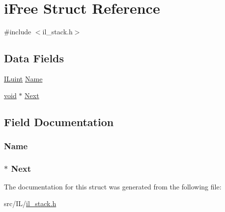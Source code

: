 \hypertarget{structi_free}{\section{i\-Free Struct Reference}
\label{structi_free}
}


{\ttfamily \#include $<$il\-\_\-stack.\-h$>$}

\subsection*{Data Fields}
\begin{DoxyCompactItemize}
\item 
\hyperlink{il_8h_ac6508d0e9c19e32f32e00d54b5b8cf30}{I\-Luint} \hyperlink{structi_free_ab7c253d8f7a40f4b1e0e434cddbcf67d}{Name}
\item 
\hyperlink{il_8h_a5530e04d947bcddd83639ea7940faf10}{void} $\ast$ \hyperlink{structi_free_a9c1fb6e887705cb28e8f5bdfa05d25f8}{Next}
\end{DoxyCompactItemize}


\subsection{Field Documentation}
\hypertarget{structi_free_ab7c253d8f7a40f4b1e0e434cddbcf67d}{
\subsubsection[{Name}]{ Name}}\label{structi_free_ab7c253d8f7a40f4b1e0e434cddbcf67d}
\hypertarget{structi_free_a9c1fb6e887705cb28e8f5bdfa05d25f8}{
\subsubsection[{Next}]{$\ast$ Next}}\label{structi_free_a9c1fb6e887705cb28e8f5bdfa05d25f8}


The documentation for this struct was generated from the following file\-:\begin{DoxyCompactItemize}
\item 
src/\-I\-L/\hyperlink{il__stack_8h}{il\-\_\-stack.\-h}\end{DoxyCompactItemize}
